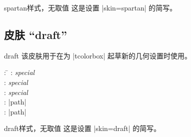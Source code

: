 \begin{docTcbKey}{spartan}{}{样式，无取值}
  这是设置 |skin=spartan| 的简写。
\end{docTcbKey}


\begin{dispExample}
\end{dispExample}


\clearpage

\subsection{皮肤 \enquote{draft}}\label{subsec:draft}

\begin{docSkin}{draft}
  该皮肤用于在为 |tcolorbox| 起草新的几何设置时使用。
\begin{tcolorbox}[skintable=draft]
  \begin{tabbing}
    : \=\kill
    :           \> \emph{special}\\
    : \> \emph{special}\\ 
    :        \> \emph{special}\\
    :    \> |path|\\
    :           \> |path|
  \end{tabbing}
\end{tcolorbox}
\end{docSkin}

\begin{docTcbKey}{draft}{}{样式，无取值}
  这是设置 |skin=draft| 的简写。
\end{docTcbKey}


\begin{dispExample}
\end{dispExample}



\begin{dispExample}
\vspace*{3mm}
\begin{tcolorbox}[draft,title=A colored box with the \enquote{draft} skin]
\lipsum[1-3]
\tcblower
\lipsum[4-6]
\end{tcolorbox}
\end{dispExample}



\clearpage
